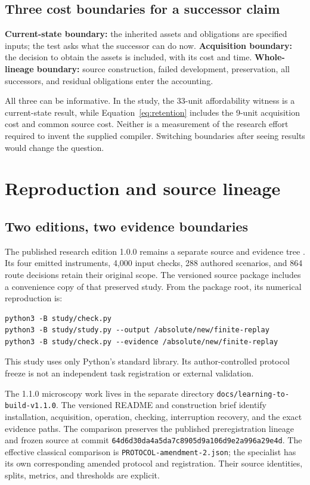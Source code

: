 \subsection{Three cost boundaries for a successor claim}

\textbf{Current-state boundary:} the inherited assets and obligations are specified inputs; the test asks what the successor can do now. \textbf{Acquisition boundary:} the decision to obtain the assets is included, with its cost and time. \textbf{Whole-lineage boundary:} source construction, failed development, preservation, all successors, and residual obligations enter the accounting.

All three can be informative. In the study, the 33-unit affordability witness is a current-state result, while Equation~\ref{eq:retention} includes the 9-unit acquisition cost and common source cost. Neither is a measurement of the research effort required to invent the supplied compiler. Switching boundaries after seeing results would change the question.

\section{Reproduction and source lineage}
\label{app:reproduction}

\subsection{Two editions, two evidence boundaries}

The published research edition 1.0.0 remains a separate source and evidence tree \citep{learningBuildOriginal}. Its four emitted instruments, 4,000 input checks, 288 authored scenarios, and 864 route decisions retain their original scope. The versioned source package includes a convenience copy of that preserved study. From the package root, its numerical reproduction is:
\begin{lstlisting}
python3 -B study/check.py
python3 -B study/study.py --output /absolute/new/finite-replay
python3 -B study/check.py --evidence /absolute/new/finite-replay
\end{lstlisting}

This study uses only Python's standard library. Its author-controlled protocol freeze is not an independent task registration or external validation.

The 1.1.0 microscopy work lives in the separate directory \texttt{docs/learning-to-build-v1.1.0}. The versioned README and construction brief identify installation, acquisition, operation, checking, interruption recovery, and the exact evidence paths. The comparison preserves the published preregistration lineage and frozen source at commit \texttt{64d6d30da4a5da7c8905d9a106d9e2a996a29e4d}. The effective classical comparison is \texttt{PROTOCOL-amendment-2.json}; the specialist has its own corresponding amended protocol and registration. Their source identities, splits, metrics, and thresholds are explicit.

